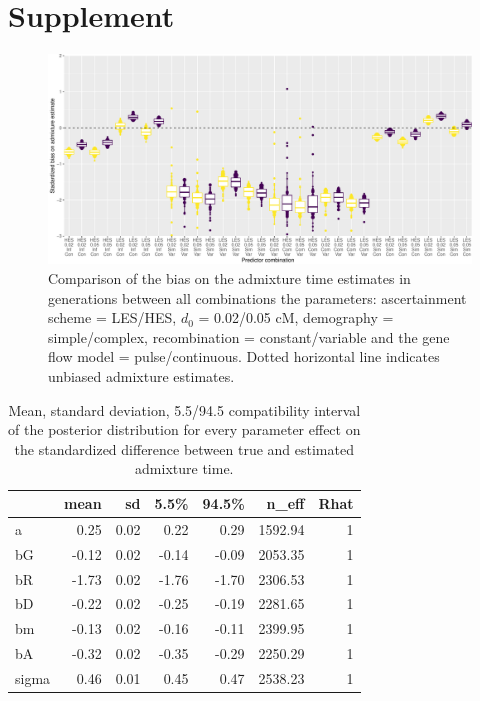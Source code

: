 \documentclass[]{article}
\begin{document}
\hypertarget{refs}{}




\pagebreak
\setcounter{figure}{0} \renewcommand{\figurename}{Fig. S}
\renewcommand{\tablename}{Tab. S}

\section{Supplement}\label{supplement}

\begin{figure}
\centering
\includegraphics{Admixture_Time_Inference_Paper_Draft_files/figure-latex/figS1-1.pdf}
\caption{\label{fig:figS1}Comparison of the bias on the admixture time
estimates in generations between all combinations the parameters:
ascertainment scheme = LES/HES, \(d_{0}\) = 0.02/0.05 cM, demography =
simple/complex, recombination = constant/variable and the gene flow
model = pulse/continuous. Dotted horizontal line indicates unbiased
admixture estimates.}
\end{figure}

\begin{table}[h]
\caption{\label{tab:tableS1} Mean, standard deviation, 5.5/94.5 compatibility interval of the posterior distribution for every parameter effect on the standardized difference between true and estimated admixture time.}
\centering
\begin{tabular}{l|r|r|r|r|r|r}
\hline
  & mean & sd & 5.5\% & 94.5\% & n\_eff & Rhat\\
\hline
a & 0.25 & 0.02 & 0.22 & 0.29 & 1592.94 & 1\\
\hline
bG & -0.12 & 0.02 & -0.14 & -0.09 & 2053.35 & 1\\
\hline
bR & -1.73 & 0.02 & -1.76 & -1.70 & 2306.53 & 1\\
\hline
bD & -0.22 & 0.02 & -0.25 & -0.19 & 2281.65 & 1\\
\hline
bm & -0.13 & 0.02 & -0.16 & -0.11 & 2399.95 & 1\\
\hline
bA & -0.32 & 0.02 & -0.35 & -0.29 & 2250.29 & 1\\
\hline
sigma & 0.46 & 0.01 & 0.45 & 0.47 & 2538.23 & 1\\
\hline
\end{tabular}
\end{table}
\end{document}
